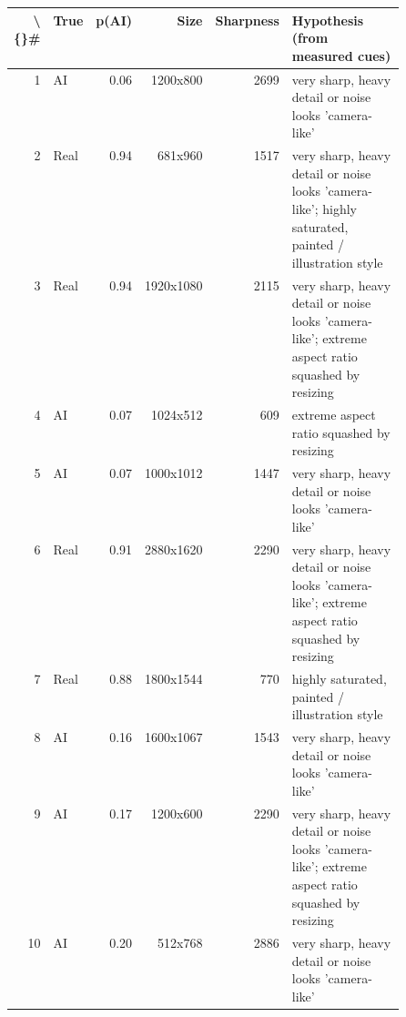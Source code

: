 \begin{tabular}{rlrrrp{0.5\linewidth}}
\toprule
\textbf{\textbackslash\{\}\#} & \textbf{True} & \textbf{p(AI)} & \textbf{Size} & \textbf{Sharpness} & \textbf{Hypothesis (from measured cues)} \\
\midrule
1 & AI & 0.06 & 1200x800 & 2699 & very sharp, heavy detail or noise looks 'camera-like' \\
2 & Real & 0.94 & 681x960 & 1517 & very sharp, heavy detail or noise looks 'camera-like'; highly saturated, painted / illustration style \\
3 & Real & 0.94 & 1920x1080 & 2115 & very sharp, heavy detail or noise looks 'camera-like'; extreme aspect ratio squashed by resizing \\
4 & AI & 0.07 & 1024x512 & 609 & extreme aspect ratio squashed by resizing \\
5 & AI & 0.07 & 1000x1012 & 1447 & very sharp, heavy detail or noise looks 'camera-like' \\
6 & Real & 0.91 & 2880x1620 & 2290 & very sharp, heavy detail or noise looks 'camera-like'; extreme aspect ratio squashed by resizing \\
7 & Real & 0.88 & 1800x1544 & 770 & highly saturated, painted / illustration style \\
8 & AI & 0.16 & 1600x1067 & 1543 & very sharp, heavy detail or noise looks 'camera-like' \\
9 & AI & 0.17 & 1200x600 & 2290 & very sharp, heavy detail or noise looks 'camera-like'; extreme aspect ratio squashed by resizing \\
10 & AI & 0.20 & 512x768 & 2886 & very sharp, heavy detail or noise looks 'camera-like' \\
\bottomrule
\end{tabular}

